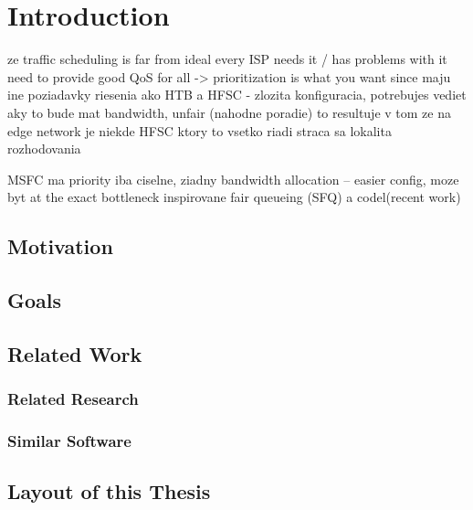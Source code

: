 \chapter*{Introduction}



ze traffic scheduling is far from ideal
every ISP needs it / has problems with it
need to provide good QoS for all -> prioritization is what you want since maju ine poziadavky
riesenia ako HTB a HFSC - zlozita konfiguracia, potrebujes vediet aky to bude mat bandwidth, unfair (nahodne poradie)
to resultuje v tom ze na edge network je niekde HFSC ktory to vsetko riadi
straca sa lokalita rozhodovania

MSFC ma priority iba ciselne, ziadny bandwidth allocation -- easier config, moze byt at the exact bottleneck
inspirovane fair queueing (SFQ) a codel(recent work)


\section*{Motivation}


\section*{Goals}


\section*{Related Work}

\subsection*{Related Research}


\subsection*{Similar Software}


\section*{Layout of this Thesis}

